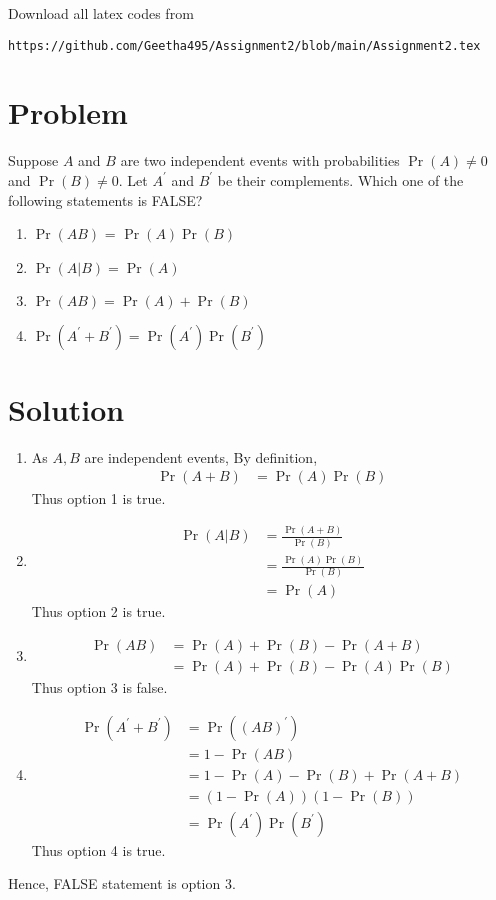 \documentclass[journal,12pt,twocolumn]{IEEEtran}
\begin{document}
Download all latex codes from 
\begin{lstlisting}
https://github.com/Geetha495/Assignment2/blob/main/Assignment2.tex
\end{lstlisting}



\section{Problem}
Suppose $A$ and $B$ are two independent events with probabilities $\Pr(A) \neq 0$ and $\Pr(B) \neq 0$.
Let $ A^{\prime}$ and $ B ^{\prime}$  be their complements. Which one of the following statements is FALSE?
\begin{enumerate}
    \item $\Pr(AB)$ = $\Pr(A)\Pr(B)$
    \item $\Pr(A|B) = \Pr(A)$
    \item $\Pr(A B) = \Pr(A) + \Pr(B)$
    \item $\Pr(A^{\prime} + B ^{\prime}) = \Pr( A ^{\prime})\Pr( B ^{\prime})$
\end{enumerate}
\section{Solution}
\begin{enumerate}
    \item As $A,B$ are independent events, By definition,  
    \begin{align*}
        \Pr(A +B) &= \Pr(A)\Pr(B)
    \end{align*}
    Thus option 1 is true.
    \item 
    \begin{align*}
        \Pr(A|B) &= \frac{\Pr(A +B)}{\Pr(B)} \\
        &= \frac{\Pr(A)\Pr(B)}{\Pr(B)}\\
        &= \Pr(A)
    \end{align*}
    Thus option 2 is true.
    \item \begin{align*}
        \Pr(A B) &= \Pr(A) + \Pr(B) - \Pr(A +B) \\
        &= \Pr(A) + \Pr(B) - \Pr(A)\Pr(B)
    \end{align*}
    Thus option 3 is false. 
    \item \begin{align*}
        \Pr( A ^{\prime} + B ^{\prime}) &= \Pr(( A B )^{\prime} )\\
        &= 1- \Pr( A B)\\
        &= 1- \Pr(A) - \Pr(B) + \Pr(A +B) \\
        &= ( 1- \Pr(A) ) ( 1- \Pr(B) ) \\
        &= \Pr( A ^{\prime})\Pr( B ^{\prime})
    \end{align*}
    Thus option 4 is true.
\end{enumerate}
Hence, FALSE statement is option 3.
\end{document}
